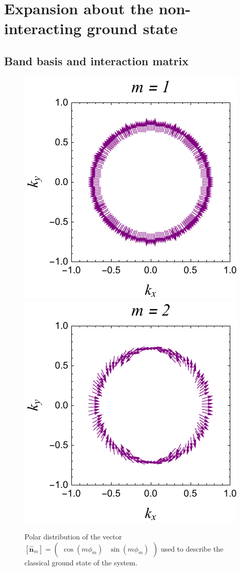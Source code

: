 \documentclass[english,aps,prd,nofootinbib,twocolumn]{revtex4-1}
\begin{document}
\section{Expansion about the non-interacting ground state}


\subsection{Band basis and interaction matrix}
\label{sect:Supp:Band-basis}

\begin{figure}
\centering
\includegraphics[scale=0.8]{1Layer.pdf}
\includegraphics[scale=0.8]{2Layer.pdf}
\caption{Polar distribution of the vector $[\hat{\mathbf{n}}_{m}]= 
\begin{pmatrix}
\cos(m\phi_{m})	&	\!\!\sin(m\phi_{m})
\end{pmatrix}$ used to describe the classical ground state of the system.}
\label{fig:Classical-gound-state}
\end{figure}
\end{document}

